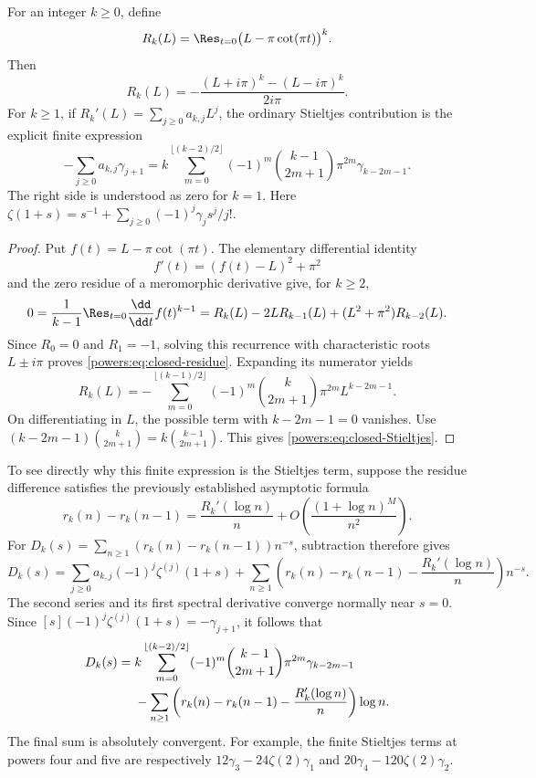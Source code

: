 \begin{lemma}
\label{powers:lem:closed-residue}
For an integer \(k\ge0\), define
\[
 R_k(L)=\Res_{t=0}\bigl(L-\pi\cot(\pi t)\bigr)^k.
\]
Then
\begin{equation}
 \boxed{\displaystyle
 R_k(L)=-\frac{(L+i\pi)^k-(L-i\pi)^k}{2i\pi}.}
 \label{powers:eq:closed-residue}
\end{equation}
For \(k\ge1\), if \(R_k'(L)=\sum_{j\ge0}a_{k,j}L^j\), the
ordinary Stieltjes contribution is the explicit finite expression
\begin{equation}
 \boxed{\displaystyle
 -\sum_{j\ge0}a_{k,j}\gamma_{j+1}
 =k\sum_{m=0}^{\lfloor(k-2)/2\rfloor}
       (-1)^m\binom{k-1}{2m+1}\pi^{2m}\gamma_{k-2m-1}.}
 \label{powers:eq:closed-Stieltjes}
\end{equation}
The right side is understood as zero for \(k=1\). Here
\(\zeta(1+s)=s^{-1}+\sum_{j\ge0}(-1)^j\gamma_j s^j/j!\).
\end{lemma}

\begin{proof}
Put \(f(t)=L-\pi\cot(\pi t)\). The elementary differential
identity
\[
 f'(t)=(f(t)-L)^2+\pi^2
\]
and the zero residue of a meromorphic derivative give, for \(k\ge2\),
\[
 0=\frac1{k-1}\Res_{t=0}\frac{\dd}{\dd t}f(t)^{k-1}
   =R_k(L)-2LR_{k-1}(L)+(L^2+\pi^2)R_{k-2}(L).
\]
Since \(R_0=0\) and \(R_1=-1\), solving this recurrence with
characteristic roots \(L\pm i\pi\) proves
\eqref{powers:eq:closed-residue}. Expanding its numerator yields
\[
 R_k(L)=-\sum_{m=0}^{\lfloor(k-1)/2\rfloor}
       (-1)^m\binom{k}{2m+1}\pi^{2m}L^{k-2m-1}.
\]
On differentiating in \(L\), the possible term with
\(k-2m-1=0\) vanishes. Use
\((k-2m-1)\binom{k}{2m+1}=k\binom{k-1}{2m+1}\).
This gives \eqref{powers:eq:closed-Stieltjes}.
\end{proof}

To see directly why this finite expression is the Stieltjes term,
suppose the residue difference satisfies the previously established
asymptotic formula
\[
 r_k(n)-r_k(n-1)
   =\frac{R_k'(\log n)}n
          +O\!\left(\frac{(1+\log n)^M}{n^2}\right).
\]
For \(D_k(s)=\sum_{n\ge1}(r_k(n)-r_k(n-1))n^{-s}\), subtraction
therefore gives
\[
 D_k(s)=\sum_{j\ge0}a_{k,j}(-1)^j\zeta^{(j)}(1+s)
 +\sum_{n\ge1}
   \left(r_k(n)-r_k(n-1)-\frac{R_k'(\log n)}n\right)n^{-s}.
\]
The second series and its first spectral derivative converge normally
near \(s=0\). Since
\([s](-1)^j\zeta^{(j)}(1+s)=-\gamma_{j+1}\), it follows that
\begin{align}
 [s]D_k(s)
 ={}&k\sum_{m=0}^{\lfloor(k-2)/2\rfloor}
       (-1)^m\binom{k-1}{2m+1}\pi^{2m}\gamma_{k-2m-1}
       \notag\\
 &-\sum_{n\ge1}
   \left(r_k(n)-r_k(n-1)-\frac{R_k'(\log n)}n\right)\log n.
 \label{powers:eq:closed-Dlinear}
\end{align}
The final sum is absolutely convergent. For example, the finite
Stieltjes terms at powers four and five are respectively
\(12\gamma_3-24\zeta(2)\gamma_1\) and
\(20\gamma_4-120\zeta(2)\gamma_2\).
